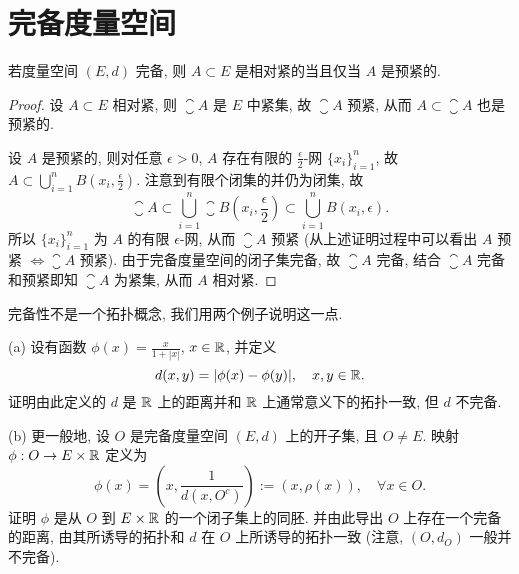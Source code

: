 \chapter{完备度量空间}
\thispagestyle{empty}



\begin{corollary}[推论 2.5.7]
    若度量空间 $(E,d)$ 完备, 则 $A\subset E$ 是相对紧的当且仅当 $A$ 是预紧的.
\end{corollary}

\begin{proof}
    \necessary
    设 $A\subset E$ 相对紧, 则 $\closure{A}$ 是 $E$ 中紧集, 故 $\closure{A}$
    预紧, 从而 $A\subset\closure{A}$ 也是预紧的.

    \sufficient
    设 $A$ 是预紧的, 则对任意 $\epsilon>0$, $A$ 存在有限的 $\frac{\epsilon}{2}$-网
    $\{x_i\}_{i=1}^n$, 故 $A\subset\bigcup_{i=1}^n B(x_i,\frac{\epsilon}{2})$.
    注意到有限个闭集的并仍为闭集, 故
    \[\closure{A}\subset\bigcup_{i=1}^n\closure{B\left(x_i,\frac{\epsilon}{2}\right)}\subset\bigcup_{i=1}^n B(x_i,\epsilon).\]
    所以 $\{x_i\}_{i=1}^n$ 为 $A$ 的有限 $\epsilon$-网, 从而 $\closure{A}$ 预紧
    (从上述证明过程中可以看出 $A$ 预紧 $\iff\closure{A}$ 预紧).
    由于完备度量空间的闭子集完备, 故 $\closure{A}$ 完备, 结合 $\closure{A}$
    完备和预紧即知 $\closure{A}$ 为紧集, 从而 $A$ 相对紧.
\end{proof}



\begin{exercise}
    完备性不是一个拓扑概念, 我们用两个例子说明这一点.

    (a) 设有函数 $\phi(x)=\frac{x}{1+|x|}$, $x\in\mathbb{R}$, 并定义
    \[d(x,y)=|\phi(x)-\phi(y)|,\quad x,y\in\mathbb{R}.\]
    证明由此定义的 $d$ 是 $\mathbb{R}$ 上的距离并和 $\mathbb{R}$ 上通常意义下的拓扑一致, 但 $d$ 不完备.

    (b) 更一般地, 设 $O$ 是完备度量空间 $(E,d)$ 上的开子集, 且 $O\neq E$.
    映射 $\phi:O\to E\times\mathbb{R}$ 定义为
    \[\phi(x)=\left(x,\frac{1}{d(x,O^c)}\right):=(x,\rho(x)),\quad\forall x\in O.\]
    证明 $\phi$ 是从 $O$ 到 $E\times\mathbb{R}$ 的一个闭子集上的同胚. 并由此导出 $O$ 上存在一个完备的距离,
    由其所诱导的拓扑和 $d$ 在 $O$ 上所诱导的拓扑一致 (注意, $(O,d_O)$ 一般并不完备).
\end{exercise}


